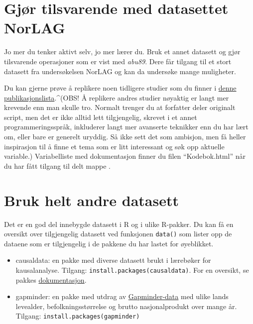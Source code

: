 \documentclass[
  letterpaper,
  DIV=11,
  numbers=noendperiod]{scrreprt}
\providecommand{\tightlist}{%
  \setlength{\itemsep}{0pt}\setlength{\parskip}{0pt}}\usepackage{longtable,booktabs,array}
\theoremstyle{definition}
\theoremstyle{remark}
\begin{document}
\hypertarget{gjuxf8r-tilsvarende-med-datasettet-norlag}{%
\section{Gjør tilsvarende med datasettet
NorLAG}\label{gjuxf8r-tilsvarende-med-datasettet-norlag}}

Jo mer du tenker aktivt selv, jo mer lærer du. Bruk et annet datasett og
gjør tilsvarende operasjoner som er vist med \emph{abu89}. Dere får
tilgang til et stort datasett fra undersøkelsen NorLAG og kan da
undersøke mange muligheter.

Du kan gjerne prøve å replikere noen tidligere studier som du finner i
\href{https://norlag.nsd.no/publications}{denne
publikasjonslista}.\^{}(OBS! Å replikere andres studier nøyaktig er
langt mer krevende enn man skulle tro. Normalt trenger du at forfatter
deler originalt script, men det er ikke alltid lett tilgjengelig,
skrevet i et annet programmeringsspråk, inkluderer langt mer avanserte
teknikker enn du har lært om, eller bare er generelt uryddig. Så ikke
sett det som ambisjon, men få heller inspirasjon til å finne et tema som
er litt interessant og søk opp aktuelle variable.) Variabelliste med
dokumentasjon finner du filen ``Kodebok.html'' når du har fått tilgang
til delt mappe .

\hypertarget{bruk-helt-andre-datasett}{%
\section{Bruk helt andre datasett}\label{bruk-helt-andre-datasett}}

Det er en god del innebygde datasett i R og i ulike R-pakker. Du kan få
en oversikt over tilgjengelig datasett ved funksjonen \texttt{data()}
som lister opp de dataene som er tilgjengelig i de pakkene du har lastet
for øyeblikket.

\begin{itemize}
\tightlist
\item
  causaldata: en pakke med diverse datasett brukt i lærebøker for
  kausalanalyse. Tilgang: \texttt{install.packages(causaldata)}. For en
  oversikt, se pakkes
  \href{https://cran.r-project.org/web/packages/causaldata/causaldata.pdf}{dokumentasjon}.
\item
  gapminder: en pakke med utdrag av
  \href{https://www.gapminder.org/data/}{Gapminder-data} med ulike lands
  levealder, befolkningsstørrelse og brutto nasjonalprodukt over mange
  år. Tilgang: \texttt{install.packages(gapminder)}
\end{itemize}
\end{document}
